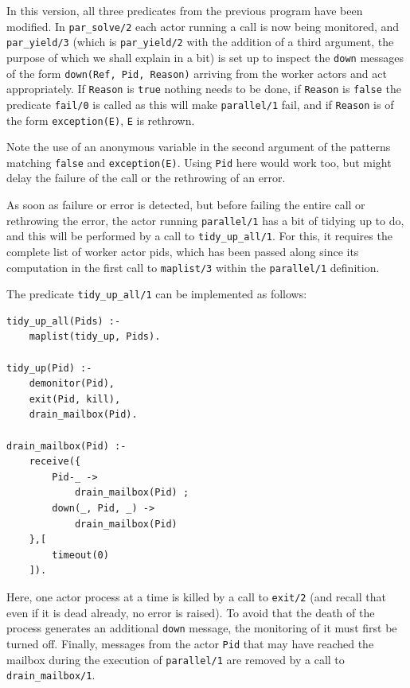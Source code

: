 \noindent In this version, all three predicates from the previous program have been modified. In \texttt{par\_solve/2} each actor running a call is now being monitored, and \texttt{par\_yield/3} (which is \texttt{par\_yield/2} with the addition of a third argument, the purpose of which we shall explain in a bit) is set up to inspect the \texttt{down} messages of the form \texttt{down(Ref, Pid, Reason)} arriving from the worker actors and act appropriately. If \texttt{Reason} is \texttt{true} nothing needs to be done, if \texttt{Reason} is \texttt{false} the predicate \texttt{fail/0} is called as this will make \texttt{parallel/1} fail, and if \texttt{Reason} is of the form \texttt{exception(E)}, \texttt{E} is rethrown.

Note the use of an anonymous variable in the second argument of the patterns matching \texttt{false} and \texttt{exception(E)}. Using \texttt{Pid} here would work too, but might delay the failure of the call or the rethrowing of an error.

As soon as failure or error is detected, but before failing the entire call or rethrowing the error, the actor running \texttt{parallel/1} has a bit of tidying up to do, and this will be performed by a call to \texttt{tidy\_up\_all/1}. For this, it requires the complete list of worker actor pids, which has been passed along since its computation in the first call to \texttt{maplist/3} within the \texttt{parallel/1} definition.

The predicate \texttt{tidy\_up\_all/1} can be implemented as follows:  

\begin{verbatim}
tidy_up_all(Pids) :-
    maplist(tidy_up, Pids).

tidy_up(Pid) :-
    demonitor(Pid),
    exit(Pid, kill),
    drain_mailbox(Pid).

drain_mailbox(Pid) :-
    receive({
        Pid-_ ->
            drain_mailbox(Pid) ;
        down(_, Pid, _) ->
            drain_mailbox(Pid)
    },[
        timeout(0)
    ]).
\end{verbatim}

\noindent Here, one actor process at a time is killed by a call to \texttt{exit/2} (and recall that even if it is dead already, no error is raised). To avoid that the death of the process generates an additional \texttt{down} message, the monitoring of it must first be turned off. Finally, messages from the actor \texttt{Pid} that may have reached the mailbox during the execution of \texttt{parallel/1} are removed by a call to \texttt{drain\_mailbox/1}.

